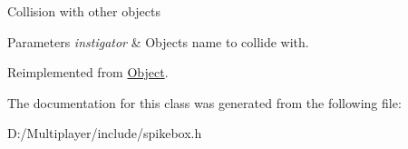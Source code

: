 Collision with other objects 
\begin{DoxyParams}{Parameters}
{\em instigator} & Objects name to collide with. \\
\hline
\end{DoxyParams}


Reimplemented from \hyperlink{class_object_a0af60ea226dcb885e69483452d34a47a}{Object}.



The documentation for this class was generated from the following file\+:\begin{DoxyCompactItemize}
\item 
D\+:/\+Multiplayer/include/spikebox.\+h\end{DoxyCompactItemize}
